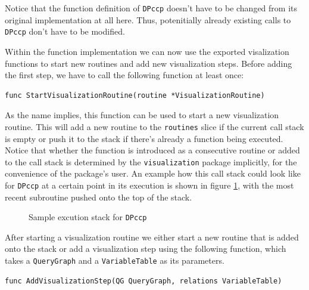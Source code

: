 \begin{note}
Notice that the function definition of \texttt{DPccp} doesn't have to be changed from its original implementation at all here. Thus, potenitially already existing calls to \texttt{DPccp} don't have to be modified.
\end{note}

Within the function implementation we can now use the exported visalization functions to start new routines and add new visualization steps. Before adding the first step, we have to call the following function at least once: 
\begin{verbatim}
func StartVisualizationRoutine(routine *VisualizationRoutine)
\end{verbatim}

As the name implies, this function can be used to start a new visualization routine. This will add a new routine to the \texttt{routines} slice if the current call stack is empty or push it to the stack if there's already a function being executed. Notice that whether the function is introduced as a consecutive routine or added to the call stack is determined by the \texttt{visualization} package implicitly, for the convenience of the package's user. An example how this call stack could look like for \texttt{DPccp} at a certain point in its execution is shown in figure \ref{fig:execution-stack}, with the most recent subroutine pushed onto the top of the stack.

\begin{figure}[H]
\caption{Sample excution stack for \texttt{DPccp}}
\label{fig:execution-stack}
\end{figure}

After starting a visualization routine we either start a new routine that is added onto the stack or add a visualization step using the following function, which takes a \texttt{QueryGraph} and a \texttt{VariableTable} as its parameters.

\begin{verbatim}
func AddVisualizationStep(QG QueryGraph, relations VariableTable)
\end{verbatim}

